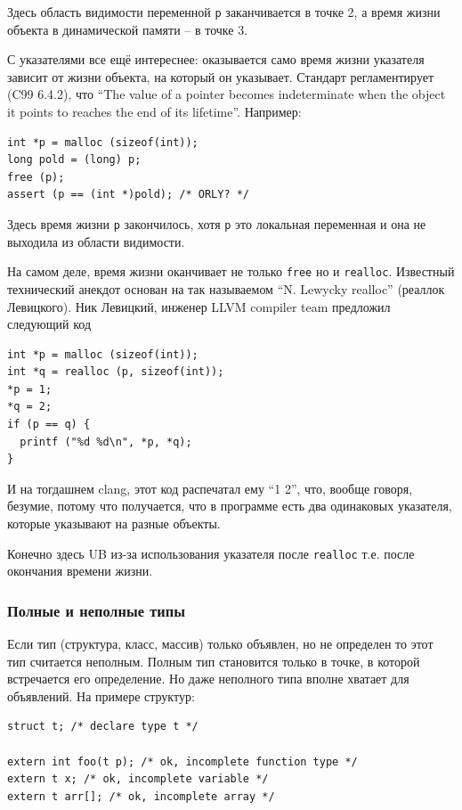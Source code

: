 \documentclass[a4paper,12pt,oneside]{article}
\begin{document}
Здесь область видимости переменной \lstinline!p! заканчивается в точке 2, а время жизни объекта в динамической памяти -- в точке 3.

С указателями все ещё интереснее: оказывается само время жизни указателя зависит от жизни объекта, на который он указывает. Стандарт регламентирует (C99 6.4.2), что ``The value of a pointer becomes indeterminate when the object it points to reaches the end of its lifetime''. Например:

\begin{lstlisting}
int *p = malloc (sizeof(int));
long pold = (long) p;
free (p);
assert (p == (int *)pold); /* ORLY? */
\end{lstlisting}

Здесь время жизни \lstinline!p! закончилось, хотя \lstinline!p! это локальная переменная и она не выходила из области видимости.

На самом деле, время жизни оканчивает не только \lstinline!free! но и \lstinline!realloc!. Известный технический анекдот основан на так называемом ``N. Lewycky realloc'' (реаллок Левицкого). Ник Левицкий, инженер LLVM compiler team предложил следующий код

\begin{lstlisting}
int *p = malloc (sizeof(int));
int *q = realloc (p, sizeof(int));
*p = 1;
*q = 2;
if (p == q) {
  printf ("%d %d\n", *p, *q);
}
\end{lstlisting}

И на тогдашнем clang, этот код распечатал ему ``1 2'', что, вообще говоря, безумие, потому что получается, что в программе есть два одинаковых указателя, которые указывают на разные объекты.

Конечно здесь UB из-за использования указателя после \lstinline!realloc! т.е. после окончания времени жизни.

\subsubsection{Полные и неполные типы}

Если тип (структура, класс, массив) только объявлен, но не определен то этот тип считается неполным. Полным тип становится только в точке, в которой встречается его определение. Но даже неполного типа вполне хватает для объявлений. На примере структур:

\begin{lstlisting}
struct t; /* declare type t */

extern int foo(t p); /* ok, incomplete function type */
extern t x; /* ok, incomplete variable */
extern t arr[]; /* ok, incomplete array */
\end{lstlisting}
\end{document}
